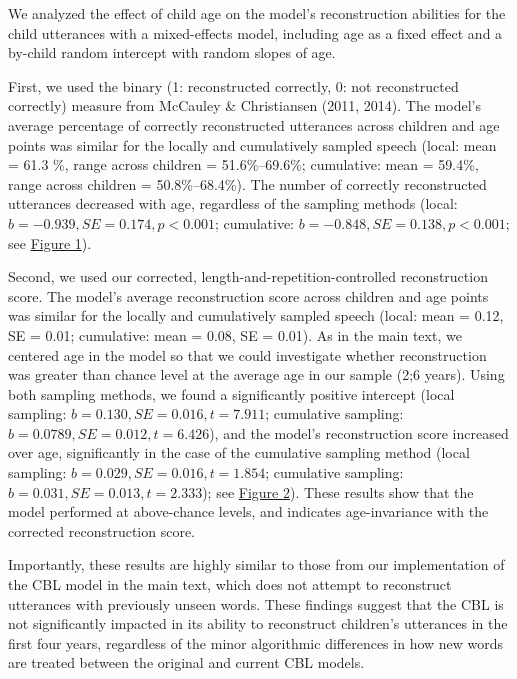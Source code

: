 \documentclass[man,mask,floatsintext]{apa6}
\begin{document}
We analyzed the effect of child age on the model's reconstruction
abilities for the child utterances with a mixed-effects model, including
age as a fixed effect and a by-child random intercept with random slopes
of age.

First, we used the binary (1: reconstructed correctly, 0: not
reconstructed correctly) measure from McCauley \& Christiansen (2011,
2014). The model's average percentage of correctly reconstructed
utterances across children and age points was similar for the locally
and cumulatively sampled speech (local: mean = 61.3 \%, range across
children = 51.6\%--69.6\%; cumulative: mean = 59.4\%, range across
children = 50.8\%--68.4\%). The number of correctly reconstructed
utterances decreased with age, regardless of the sampling methods
(local: \(b = -0.939, SE = 0.174, p < 0.001\); cumulative:
\(b = -0.848, SE = 0.138, p < 0.001\); see
\protect\hyperlink{smfig1}{Figure 1}).

Second, we used our corrected, length-and-repetition-controlled
reconstruction score. The model's average reconstruction score across
children and age points was similar for the locally and cumulatively
sampled speech (local: mean = 0.12, SE = 0.01; cumulative: mean = 0.08,
SE = 0.01). As in the main text, we centered age in the model so that we
could investigate whether reconstruction was greater than chance level
at the average age in our sample (2;6 years). Using both sampling
methods, we found a significantly positive intercept (local sampling:
\(b = 0.130, SE = 0.016, t = 7.911\); cumulative sampling:
\(b = 0.0789, SE = 0.012, t = 6.426\)), and the model's reconstruction
score increased over age, significantly in the case of the cumulative
sampling method (local sampling: \(b = 0.029, SE = 0.016, t = 1.854\);
cumulative sampling: \(b = 0.031, SE = 0.013, t = 2.333\)); see
\protect\hyperlink{smfig2}{Figure 2}). These results show that the model
performed at above-chance levels, and indicates age-invariance with the
corrected reconstruction score.

Importantly, these results are highly similar to those from our
implementation of the CBL model in the main text, which does not attempt
to reconstruct utterances with previously unseen words. These findings
suggest that the CBL is not significantly impacted in its ability to
reconstruct children's utterances in the first four years, regardless of
the minor algorithmic differences in how new words are treated between
the original and current CBL models.
\end{document}
